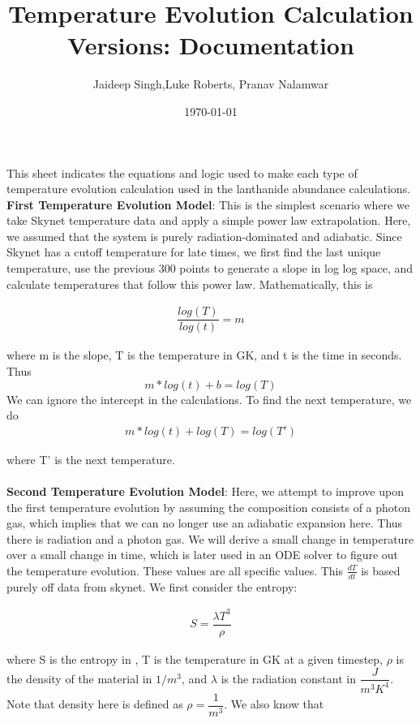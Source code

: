 \documentclass[11pt,a4paper]{article}
\begin{document}
\title{Temperature Evolution Calculation Versions: Documentation}
\author{Jaideep Singh,Luke Roberts, Pranav Nalamwar}
\date{\today}
\maketitle   This sheet indicates the equations and logic used to make each type of temperature evolution calculation used in the lanthanide abundance calculations. \\

\textbf{First Temperature Evolution Model}: This is the simplest scenario where we take Skynet temperature data and apply a simple power law extrapolation. Here, we assumed that the system is purely radiation-dominated and adiabatic. Since Skynet has a cutoff temperature for late times, we first find the last unique temperature, use the previous 300 points to generate a slope in log log space, and calculate temperatures that follow this power law. Mathematically, this is 

\begin{align}
	\dfrac{log(T)}{log(t)} = m 
\end{align}

 where m is the slope, T is the temperature in GK, and t is the time in seconds. Thus
$$ m*log(t) + b = log(T) $$ We can ignore the intercept in the calculations. To find the next temperature, we do
\begin{align}
	m*log(t) + log(T) = log(T')
\end{align}

where T' is the next temperature. \\ \\

\textbf{Second Temperature Evolution Model}: Here, we attempt to improve upon the first temperature evolution by assuming the composition consists of a photon gas, which implies that we can no longer use an adiabatic expansion here. Thus there is radiation and a photon gas. We will derive a small change in temperature over a small change in time, which is later used in an ODE solver to figure out the temperature evolution. These values are all specific values. This $\frac{dT}{dt}$ is based purely off data from skynet. We first consider the entropy:

\begin{align}
	S = \dfrac{\lambda T^3}{\rho}
\end{align}

where S is the entropy in , T is the temperature in GK at a given timestep, $\rho$ is the density of the material in $1/m^3$, and $\lambda$ is the radiation constant in $\dfrac{J}{m^3 K^4}$. Note that density here is defined as $\rho = \dfrac{1}{m^3}$. We also know that 
\end{document}
